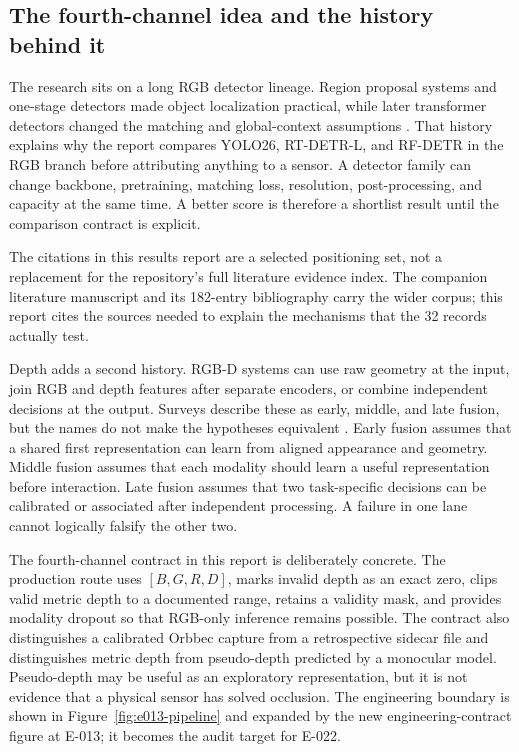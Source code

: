 \documentclass[preprint,12pt]{elsarticle}
\begin{document}
\subsection{The fourth-channel idea and the history behind it}
The research sits on a long RGB detector lineage. Region proposal systems and
one-stage detectors made object localization practical, while later
transformer detectors changed the matching and global-context assumptions
\cite{redmon2016yolo,carion2020detr,zhao2024rtdetr,robinson2025rfdetr}. That history
explains why the report compares YOLO26, RT-DETR-L, and RF-DETR in the RGB
branch before attributing anything to a sensor. A detector family can change
backbone, pretraining, matching loss, resolution, post-processing, and
capacity at the same time. A better score is therefore a shortlist result
until the comparison contract is explicit.

The citations in this results report are a selected positioning set, not a
replacement for the repository's full literature evidence index. The companion
literature manuscript and its 182-entry bibliography carry the wider corpus;
this report cites the sources needed to explain the mechanisms that the 32
records actually test.

Depth adds a second history. RGB-D systems can use raw geometry at the input,
join RGB and depth features after separate encoders, or combine independent
decisions at the output. Surveys describe these as early, middle, and late
fusion, but the names do not make the hypotheses equivalent
\cite{feng2021multimodalsurvey,zhou2021rgbdsurvey}. Early fusion assumes that a
shared first representation can learn from aligned appearance and geometry.
Middle fusion assumes that each modality should learn a useful representation
before interaction. Late fusion assumes that two task-specific decisions can
be calibrated or associated after independent processing. A failure in one
lane cannot logically falsify the other two.

The fourth-channel contract in this report is deliberately concrete. The
production route uses \([B,G,R,D]\), marks invalid depth as an exact zero,
clips valid metric depth to a documented range, retains a validity mask, and
provides modality dropout so that RGB-only inference remains possible. The
contract also distinguishes a calibrated Orbbec capture from a retrospective
sidecar file and distinguishes metric depth from pseudo-depth predicted by a
monocular model. Pseudo-depth may be useful as an exploratory representation,
but it is not evidence that a physical sensor has solved occlusion. The
engineering boundary is shown in Figure~\ref{fig:e013-pipeline} and expanded
by the new engineering-contract figure at E-013; it becomes the audit target
for E-022.
\end{document}
